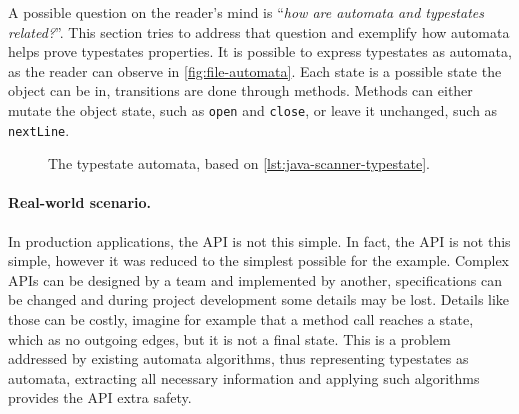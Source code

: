 A possible question on the reader's mind is “\emph{how are automata and typestates related?}”.
This section tries to address that question and exemplify how automata helps prove typestates properties.
It is possible to express typestates as automata, as the reader can observe in \autoref{fig:file-automata}.
Each state is a possible state the object can be in, transitions are done through methods.
Methods can either mutate the object state, such as \texttt{open} and \texttt{close},
or leave it unchanged, such as \texttt{nextLine}.

\begin{figure}
    \centering
    \caption{The  typestate automata, based on \autoref{lst:java-scanner-typestate}.}
    \label{fig:file-automata}
\end{figure}

\paragraph{Real-world scenario.} In production applications, the API is not this simple.
In fact, the  API is not this simple, however it was reduced to the simplest possible for the example.
Complex APIs can be designed by a team and implemented by another,
specifications can be changed and during project development some details may be lost.
Details like those can be costly, imagine for example that a method call reaches a state, which as no outgoing edges,
but it is not a final state. This is a problem addressed by existing automata algorithms,
thus representing typestates as automata,
extracting all necessary information and applying such algorithms provides the API extra safety.

